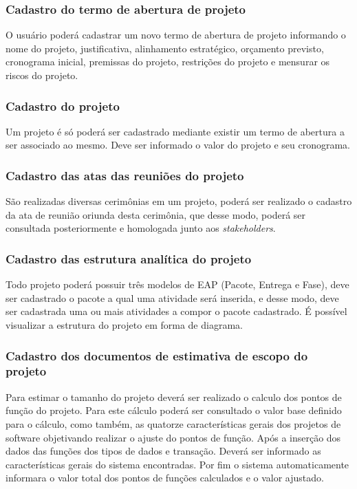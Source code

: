 \documentclass{acm_proc_article-sp}
\begin{document}
\subsubsection{Cadastro do termo de abertura de projeto}
O usuário poderá cadastrar um novo termo de abertura de projeto informando o nome do projeto, justificativa, alinhamento estratégico, orçamento previsto, cronograma inicial, premissas do projeto, restrições do projeto e mensurar os riscos do projeto. 

\subsubsection{Cadastro do projeto}
Um projeto é só poderá ser cadastrado mediante existir um termo de abertura a ser associado ao mesmo. Deve ser informado o valor do projeto e seu cronograma.

\subsubsection{Cadastro das atas das reuniões do projeto}
São realizadas diversas cerimônias em um projeto, poderá ser realizado o cadastro da ata de reunião oriunda desta cerimônia, que desse modo, poderá ser consultada posteriormente e homologada junto aos \textit{stakeholders}.

\subsubsection{Cadastro das estrutura analítica do projeto}
Todo projeto poderá possuir três modelos de EAP (Pacote, Entrega e Fase), deve ser cadastrado o pacote a qual uma atividade será inserida, e desse modo, deve ser cadastrada uma ou mais atividades a compor o pacote cadastrado. É possível visualizar a estrutura do projeto em forma de diagrama. 

\subsubsection{Cadastro dos documentos de estimativa de escopo do projeto}
Para estimar o tamanho do projeto deverá ser realizado o calculo dos pontos de função do projeto. Para este cálculo poderá ser consultado o valor base definido para o cálculo, como também, as quatorze características gerais dos projetos de software objetivando realizar o ajuste do pontos de função. Após a inserção dos dados das funções dos tipos de dados e transação. Deverá ser informado as características gerais do sistema encontradas. Por fim o sistema automaticamente informara o valor total dos pontos de funções calculados e o valor ajustado.
\end{document}
